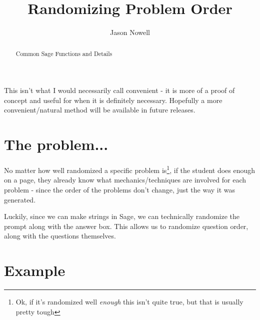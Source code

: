 \documentclass{ximera}
\title{Randomizing Problem Order}
\author{Jason Nowell}
\begin{document}
\begin{abstract}
     Common Sage Functions and Details
\end{abstract}
\maketitle

This isn't what I would necessarily call convenient - it is more of a proof of concept and useful for when it is definitely necessary. Hopefully a more convenient/natural method will be available in future releases.

\section{The problem...}

    No matter how well randomized a specific problem is\footnote{Ok, if it's randomized well \textit{enough} this isn't quite true, but that is usually pretty tough}, if the student does enough on a page, they already know what mechanics/techniques are involved for each problem - since the order of the problems don't change, just the way it was generated.
    
    Luckily, since we can make strings in Sage, we can technically randomize the prompt along with the answer box. This allows us to randomize question order, along with the questions themselves. 


\section{Example}
\end{document}
